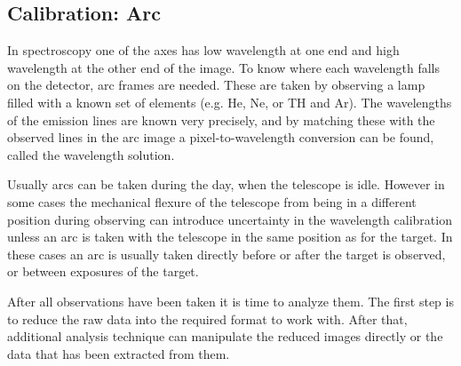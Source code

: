 \documentclass[a4paper,oneside,12pt, class=Latex/Classes/PhDthesisPSnPDF, crop=false]{standalone}
\begin{document}

\subsection{Calibration: Arc}
In spectroscopy one of the axes has low wavelength at one end and high wavelength at the other end of the image. To know where each wavelength falls on the detector, arc frames are needed. These are taken by observing a lamp filled with a known set of elements (e.g. He, Ne, or TH and Ar). The wavelengths of the emission lines are known very precisely, and by matching these with the observed lines in the arc image a pixel-to-wavelength conversion can be found, called the wavelength solution.

Usually arcs can be taken during the day, when the telescope is idle. However in some cases the mechanical flexure of the telescope from being in a different position during observing can introduce uncertainty in the wavelength calibration unless an arc is taken with the telescope in the same position as for the target. In these cases an arc is usually taken directly before or after the target is observed, or between exposures of the target.


After all observations have been taken it is time to analyze them. The first step is to reduce the raw data into the required format to work with. After that, additional analysis technique can manipulate the reduced images directly or the data that has been extracted from them.
\end{document}
